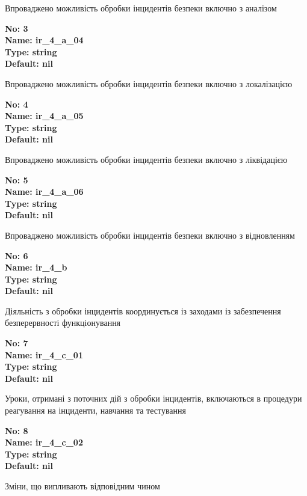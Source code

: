 \documentclass{article}
\begin{document}
{\footnotesize Впроваджено можливість обробки інцидентів безпеки включно з аналізом}


{\footnotesize\bfseries
No: 3\\
Name: ir\_\allowbreak{}4\_\allowbreak{}a\_\allowbreak{}04\\
Type: string\\
Default: nil
}

{\footnotesize Впроваджено можливість обробки інцидентів безпеки включно з локалізацією}


{\footnotesize\bfseries
No: 4\\
Name: ir\_\allowbreak{}4\_\allowbreak{}a\_\allowbreak{}05\\
Type: string\\
Default: nil
}

{\footnotesize Впроваджено можливість обробки інцидентів безпеки включно з ліквідацією}


{\footnotesize\bfseries
No: 5\\
Name: ir\_\allowbreak{}4\_\allowbreak{}a\_\allowbreak{}06\\
Type: string\\
Default: nil
}

{\footnotesize Впроваджено можливість обробки інцидентів безпеки включно з відновленням}


{\footnotesize\bfseries
No: 6\\
Name: ir\_\allowbreak{}4\_\allowbreak{}b\\
Type: string\\
Default: nil
}

{\footnotesize Діяльність з обробки інцидентів координується із заходами із забезпечення безперервності функціонування}


{\footnotesize\bfseries
No: 7\\
Name: ir\_\allowbreak{}4\_\allowbreak{}c\_\allowbreak{}01\\
Type: string\\
Default: nil
}

{\footnotesize Уроки, отримані з поточних дій з обробки інцидентів, включаються в процедури реагування на інциденти, навчання та тестування}


{\footnotesize\bfseries
No: 8\\
Name: ir\_\allowbreak{}4\_\allowbreak{}c\_\allowbreak{}02\\
Type: string\\
Default: nil
}

{\footnotesize Зміни, що випливають відповідним чином}
\end{document}
